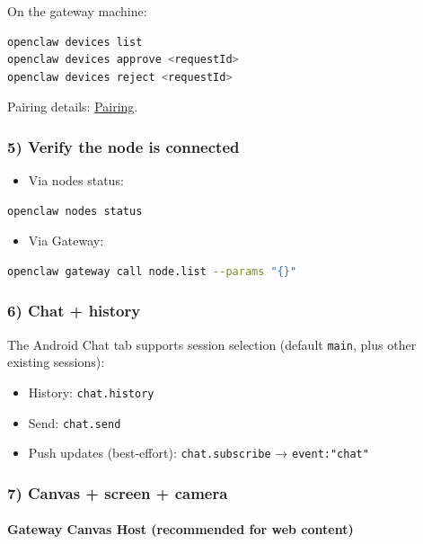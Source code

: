 On the gateway machine:

\begin{lstlisting}[language=bash]
openclaw devices list
openclaw devices approve <requestId>
openclaw devices reject <requestId>
\end{lstlisting}


Pairing details: \href{/channels/pairing}{Pairing}.

\subsubsection{5) Verify the node is connected}


\begin{itemize}
  \item Via nodes status:
\end{itemize}


\begin{lstlisting}[language=bash]
  openclaw nodes status
\end{lstlisting}


\begin{itemize}
  \item Via Gateway:
\end{itemize}


\begin{lstlisting}[language=bash]
  openclaw gateway call node.list --params "{}"
\end{lstlisting}


\subsubsection{6) Chat + history}


The Android Chat tab supports session selection (default \texttt{main}, plus other existing sessions):

\begin{itemize}
  \item History: \texttt{chat.history}
  \item Send: \texttt{chat.send}
  \item Push updates (best-effort): \texttt{chat.subscribe} → \texttt{event:"chat"}
\end{itemize}


\subsubsection{7) Canvas + screen + camera}


\paragraph{Gateway Canvas Host (recommended for web content)}


